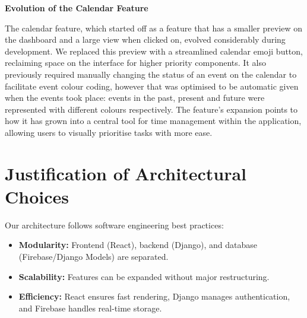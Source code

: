 \textbf{Evolution of the Calendar Feature}

The calendar feature, which started off as a feature that has a smaller preview on the dashboard and a large view when clicked on, evolved considerably during development. We replaced this preview with a streamlined calendar emoji button, reclaiming space on the interface for higher priority components. It also previously required manually changing the status of an event on the calendar to facilitate event colour coding, however that was optimised to be automatic given when the events took place: events in the past, present and future were represented with different colours respectively. The feature's expansion points to how it has grown into a central tool for time management within the application, allowing users to visually prioritise tasks with more ease.

\section{Justification of Architectural Choices}
\label{sect:justification}
Our architecture follows software engineering best practices:
\begin{itemize}
    \item \textbf{Modularity:} Frontend (React), backend (Django), and database (Firebase/Django Models) are separated.
    \item \textbf{Scalability:} Features can be expanded without major restructuring.
    \item \textbf{Efficiency:} React ensures fast rendering, Django manages authentication, and Firebase handles real-time storage.
\end{itemize}